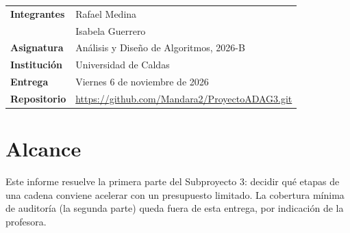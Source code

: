 \documentclass[11pt,a4paper]{article}
\theoremstyle{plano}
\begin{document}
\begin{titlepage}
\thispagestyle{empty}
\vspace*{10.2cm}

\begin{tabular}{@{}p{3.6cm}l@{}}
  \textbf{\color{acento}Integrantes} & Rafael Medina\\[6pt]
   & Isabela Guerrero\\[6pt]
  \textbf{\color{acento}Asignatura} & Análisis y Diseño de Algoritmos, 2026-B\\[6pt]
  \textbf{\color{acento}Institución} & Universidad de Caldas\\[6pt]
  \textbf{\color{acento}Entrega} & Viernes 6 de noviembre de 2026\\[6pt]
  \textbf{\color{acento}Repositorio} & {\small\ttfamily\href{https://github.com/Mandara2/ProyectoADAG3.git}{https://github.com/Mandara2/ProyectoADAG3.git}}
\end{tabular}
\end{titlepage}

\setcounter{page}{1}
\tableofcontents
\newpage

\section{Alcance}
\label{sec:alcance}

Este informe resuelve la primera parte del Subproyecto 3: decidir qué etapas de una cadena conviene acelerar con un presupuesto limitado. La cobertura mínima de auditoría (la segunda parte) queda fuera de esta entrega, por indicación de la profesora.
\end{document}
